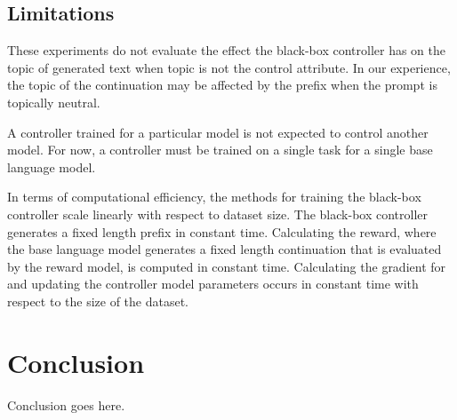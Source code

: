 \documentclass[phd,electronic,oneside,twosidetoc,letterpaper,chaptercenter,parttop,lof]{byumsphd}
\begin{document}
\section{Limitations}
\label{limitations}

These experiments do not evaluate the effect the black-box controller has on the topic of generated text when topic is not the control attribute.
In our experience, the topic of the continuation may be affected by the prefix when the prompt is topically neutral.

A controller trained for a particular model is not expected to control another model.
For now, a controller must be trained on a single task for a single base language model.

In terms of computational efficiency, the methods for training the black-box controller scale linearly with respect to dataset size.
The black-box controller generates a fixed length prefix in constant time.
Calculating the reward, where the base language model generates a fixed length continuation that is evaluated by the reward model, is computed in constant time.
Calculating the gradient for and updating the controller model parameters occurs in constant time with respect to the size of the dataset.

\chapter{Conclusion}

Conclusion goes here.



\end{document}
